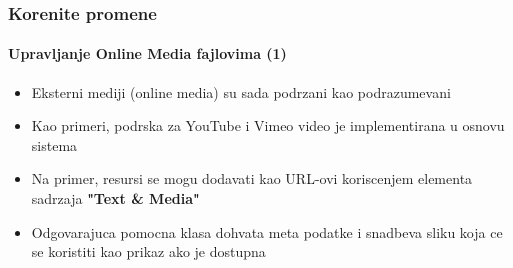 \begin{frame}[fragile]
	\frametitle{Korenite promene}
	\framesubtitle{Upravljanje Online Media fajlovima (1)}

	\begin{itemize}

		\item Eksterni mediji (online media) su sada podrzani kao podrazumevani

		\item Kao primeri, podrska za YouTube i Vimeo video je implementirana u osnovu sistema

		\item Na primer, resursi se mogu dodavati kao URL-ovi koriscenjem elementa sadrzaja \textbf{"Text \& Media"}

		\item Odgovarajuca pomocna klasa dohvata meta podatke i snadbeva sliku koja ce se koristiti kao prikaz ako je dostupna

	\end{itemize}

\end{frame}


